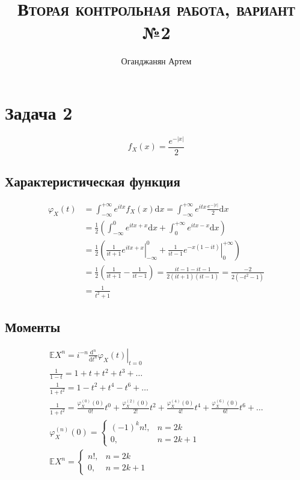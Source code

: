 \documentclass[12pt]{article}
\title{\textsc{Вторая контрольная работа, вариант №2}}
\author{Оганджанян Артем}
\date{}
\begin{document}
\theoremstyle{plain}
\newtheorem*{statement}{Утверждение}


\maketitle

\section{\texorpdfstring{Задача 2}{Task 2}}

\[
    f_X(x) = \frac{e^{-\left|x\right|}}{2}
\]

\subsection{\texorpdfstring{Характеристическая функция}{Characteristic function}}

\begin{align*}
    \varphi_X(t)
    &= \int_{-\infty}^{+\infty} e^{itx} f_X(x) \mathrm{d}x
    = \int_{-\infty}^{+\infty} e^{itx} \frac{e^{-\left|x\right|}}{2} \mathrm{d}x \\
    &= \frac{1}{2} \left(\int_{-\infty}^0 e^{itx + x} \mathrm{d}x
        + \int_0^{+\infty} e^{itx - x} \mathrm{d}x \right) \\
    &= \frac{1}{2} \left(\left.\frac{1}{it+1} e^{itx+x}\right|_{-\infty}^0
        + \left.\frac{1}{it-1} e^{-x\left(1-it\right)}\right|_0^{+\infty} \right) \\
    &= \frac{1}{2} \left(\frac{1}{it+1} - \frac{1}{it-1} \right)
    = \frac{it - 1 - it - 1}{2(it+1)(it-1)}
    = \frac{- 2}{2(-t^2 - 1)} \\
    &= \frac{1}{t^2 + 1}
\end{align*}

\subsection{\texorpdfstring{Моменты}{Moments}}

\begin{gather*}
    \mathbb E X^n = i^{-n} \left.\frac{\mathrm{d}^n}{\mathrm{d}t^n}\varphi_X(t)\right|_{t=0} \\
    \frac{1}{1 - t} = 1 + t + t^2 + t^3 + \dots \\
    \frac{1}{1 + t^2} = 1 - t^2 + t^4 - t^6 + \dots \\
    \frac{1}{1 + t^2} = \frac{\varphi^{(0)}_X(0)}{0!} t^0 + \frac{\varphi^{(2)}_X(0)}{2!} t^2 + \frac{\varphi^{(4)}_X(0)}{4!} t^4 + \frac{\varphi^{(6)}_X(0)}{6!} t^6 + \dots \\
    \varphi_X^{(n)}(0) = \begin{cases}
        (-1)^k n!, & n = 2k \\
        0,                   & n = 2k + 1
    \end{cases} \\
    \mathbb{E} X^n = \begin{cases}
        n!, & n = 2k \\
        0,  & n = 2k + 1
    \end{cases}
\end{gather*}
\end{document}
